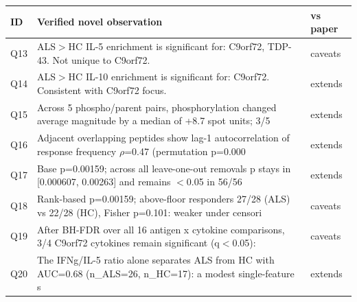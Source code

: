 \begin{tabular}{lp{10.2cm}l}
\toprule
ID & Verified novel observation & vs paper \\
\midrule
Q13 & ALS$>$HC IL-5 enrichment is significant for: C9orf72, TDP-43. Not unique to C9orf72. & caveats \\
Q14 & ALS$>$HC IL-10 enrichment is significant for: C9orf72. Consistent with C9orf72 focus. & extends \\
Q15 & Across 5 phospho/parent pairs, phosphorylation changed average magnitude by a median of +8.7 spot units; 3/5 & extends \\
Q16 & Adjacent overlapping peptides show lag-1 autocorrelation of response frequency $\rho$=0.47 (permutation p=0.000 & extends \\
Q17 & Base p=0.00159; across all leave-one-out removals p stays in [0.000607, 0.00263] and remains $<$0.05 in 56/56  & extends \\
Q18 & Rank-based p=0.00159; above-floor responders 27/28 (ALS) vs 22/28 (HC), Fisher p=0.101: weaker under censori & caveats \\
Q19 & After BH-FDR over all 16 antigen x cytokine comparisons, 3/4 C9orf72 cytokines remain significant (q$<$0.05):  & caveats \\
Q20 & The IFNg/IL-5 ratio alone separates ALS from HC with AUC=0.68 (n\_ALS=26, n\_HC=17): a modest single-feature s & extends \\
\bottomrule
\end{tabular}
